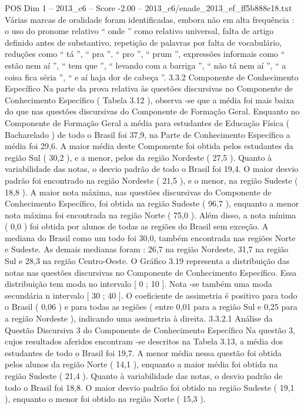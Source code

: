 \begin{textsample}{POS Dim 1 – 2013\_c6 – Score -2.00 – 2013\_c6/enade\_2013\_ef\_ff5b888e18.txt}
Várias marcas de oralidade foram identificadas, embora não em alta frequência : o uso do pronome relativo “ onde ” como relativo universal, falta de artigo definido antes de substantivo, repetição de palavras por falta de vocabulário, reduções como “ tá ”, “ pra ”, “ pro ”, “ prum ”, expressões informais como “ estão nem aí ”, “ tem que ”, “ levando com a barriga ”, “ não tá nem aí ”, “ a coisa fica séria ”, “ e aí haja dor de cabeça ”. 3.3.2 Componente de Conhecimento Específico Na parte da prova relativa às questões discursivas no Componente de Conhecimento Específico ( Tabela 3.12 ), observa -se que a média foi mais baixa do que nas questões discursivas do Componente de Formação Geral.
Enquanto no Componente de Formação Geral a média para estudantes de Educação Física ( Bacharelado ) de todo o Brasil foi 37,9, na Parte de Conhecimento Específico a média foi 29,6.
A maior média deste Componente foi obtida pelos estudantes da região Sul ( 30,2 ), e a menor, pelos da região Nordeste ( 27,5 ).
Quanto à variabilidade das notas, o desvio padrão de todo o Brasil foi 19,4.
O maior desvio padrão foi encontrado na região Nordeste ( 21,5 ), e o menor, na região Sudeste ( 18,8 ).
A maior nota máxima, nas questões discursivas do Componente de Conhecimento Específico, foi obtida na região Sudeste ( 96,7 ), enquanto a menor nota máxima foi encontrada na região Norte ( 75,0 ).
Além disso, a nota mínima ( 0,0 ) foi obtida por alunos de todas as regiões do Brasil sem exceção.
A mediana do Brasil como um todo foi 30,0, também encontrada nas regiões Norte e Sudeste.
As demais medianas foram : 26,7 na região Nordeste, 31,7 na região Sul e 28,3 na região Centro-Oeste.
O Gráfico 3.19 representa a distribuição das notas nas questões discursivas no Componente de Conhecimento Específico.
Essa distribuição tem moda no intervalo [ 0 ; 10 ].
Nota -se também uma moda secundária n intervalo [ 30 ; 40 ].
O coeficiente de assimetria é positivo para todo o Brasil ( 0,06 ) e para todas as regiões ( entre 0,01 para a região Sul e 0,25 para a região Nordeste ), indicando uma assimetria à direita. 3.3.2.1 Análise da Questão Discursiva 3 do Componente de Conhecimento Específico Na questão 3, cujos resultados aferidos encontram -se descritos na Tabela 3.13, a média dos estudantes de todo o Brasil foi 19,7.
A menor média nessa questão foi obtida pelos alunos da região Norte ( 14,1 ), enquanto a maior média foi obtida na região Sudeste ( 21,4 ).
Quanto à variabilidade das notas, o desvio padrão de todo o Brasil foi 18,8.
O maior desvio padrão foi obtido na região Sudeste ( 19,1 ), enquanto o menor foi obtido na região Norte ( 15,3 ).

\end{textsample}
